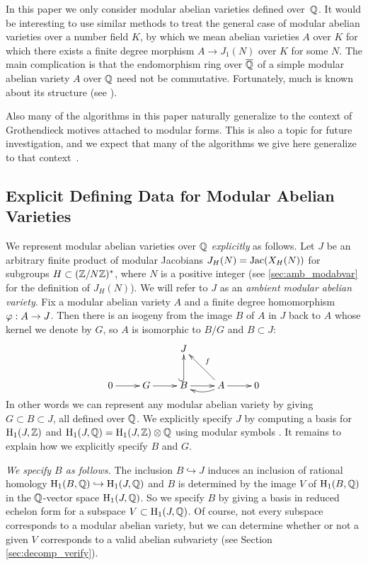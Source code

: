\documentclass{article}
\begin{document}
\begin{remark}
	In this paper we only consider modular abelian varieties defined
	over~$\mathbb{Q}$.  It would be interesting to use similar methods to treat
	the general case of modular abelian varieties over a number field
	$K$, by which we mean abelian varieties $A$ over $K$ for which there
	exists a finite degree morphism $A\to J_1(N)$ over $K$ for some
	$N$. The main complication is that the endomorphism ring over
	$\overline{\mathbb{Q}}$ of a simple modular abelian variety $A$ over $\mathbb{Q}$ need not
	be commutative.  Fortunately, much is known about its structure (see
	\cite{ribet:twistsendoalg}).

	Also many of the algorithms in this paper naturally generalize to
	the context of Grothendieck motives attached to modular forms.  This
	is also a topic for future investigation, and we expect that many of the
	algorithms we give here generalize to that
	context~\cite{dummigan-stein-watkins:motives}.
\end{remark}



\subsection{Explicit Defining Data for Modular Abelian Varieties}
We represent modular abelian varieties over $\mathbb{Q}$ {\em explicitly} as
follows. Let $J$ be an arbitrary finite product of modular Jacobians
$J_H(N)=\operatorname{Jac}(X_H(N))$ for subgroups $H\subset (\mathbb{Z}/N\mathbb{Z})^*$, where
$N$ is a positive integer (see \ref{sec:amb_modabvar} for the definition
of $J_H(N)$).  We will refer to $J$ as an \emph{ambient modular abelian
	variety}.
Fix a modular abelian variety $A$ and a
finite degree homomorphism $\varphi: A\to J$.  Then there is an isogeny
from the image $B$ of $A$ in $J$ back to $A$ whose kernel we denote by
$G$, so $A$ is isomorphic to $B/G$ and $B\subset J$:
$$
	\xymatrix{
	& & J & & \\
	0\ar[r]& G \ar[r]& B\ar@{^(->}[u] \ar[r]& A\ar[r] \ar@/^/[l]\ar[ul]_{f} & 0
	}
$$
In other words we can represent any modular abelian variety by giving $G\subset
	B\subset J$, all defined over $\mathbb{Q}$. We explicitly specify $J$ by computing a
basis for $\operatorname{H}_1(J,\mathbb{Z})$ and $\operatorname{H}_1(J,\mathbb{Q})=\operatorname{H}_1(J,\mathbb{Z})\otimes \mathbb{Q}$ using modular
symbols \cite{stein:modform}. It remains to explain how we explicitly specify
$B$ and $G$.

	{\em We specify $B$ as follows.}  The inclusion $B \hookrightarrow J$
induces an inclusion of rational homology $\operatorname{H}_1(B, \mathbb{Q}) \hookrightarrow
	\operatorname{H}_1(J, \mathbb{Q})$ and $B$ is determined by the image $V$ of $\operatorname{H}_1(B,\mathbb{Q})$ in
the $\mathbb{Q}$-vector space $\operatorname{H}_1(J,\mathbb{Q})$.  So we specify $B$ by giving a basis in
reduced echelon form for a subspace $V \subset \operatorname{H}_1(J, \mathbb{Q})$. Of
course, not every subspace corresponds to a modular abelian variety,
but we can determine whether or not a given $V$ corresponds to a valid
abelian subvariety (see Section \ref{sec:decomp_verify}).
\end{document}
